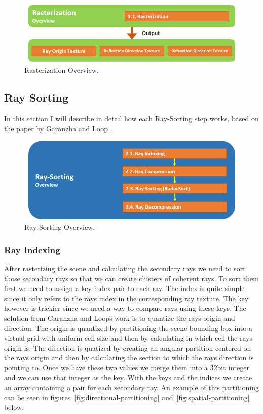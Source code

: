 \documentclass{llncs}
\begin{document}
\begin{figure}
\centering
\includegraphics[scale=0.60]{images/figure 2.png}
\caption{Rasterization Overview.}
\end{figure}

\newpage

%
\subsection{Ray Sorting}
%

In this section I will describe in detail how each Ray-Sorting step works, based on the paper by Garanzha and Loop \cite{GaranzhaLoop10}.

\begin{figure}
\centering
\includegraphics[scale=0.60]{images/figure 3.png}
\caption{Ray-Sorting Overview.}
\end{figure}

%
\subsubsection{Ray Indexing}
%

After rasterizing the scene and calculating the secondary rays we need to sort those secondary rays so that we can create clusters of coherent rays. To sort them first we need to assign a key-index pair to each ray. The index is quite simple since it only refers to the rays index in the corresponding ray texture. The key however is trickier since we need a way to compare rays using these keys. The solution from Garanzha and Loops work \cite{GaranzhaLoop10} is to quantize the rays origin and direction. The origin is quantized by partitioning the scene bounding box into a virtual grid with uniform cell size and then by calculating in which cell the rays origin is. The direction is quatized by creating an angular partition centered on the rays origin and then by calculating the section to which the rays direction is pointing to. Once we have these two values we merge them into a 32bit integer and we can use that integer as the key. With the keys and the indices we create an array containing a pair for each secondary ray. An example of this partitioning can be seen in figures~\ref{fig:directional-partitioning} and~\ref{fig:spatial-partitioning} below.
\end{document}

